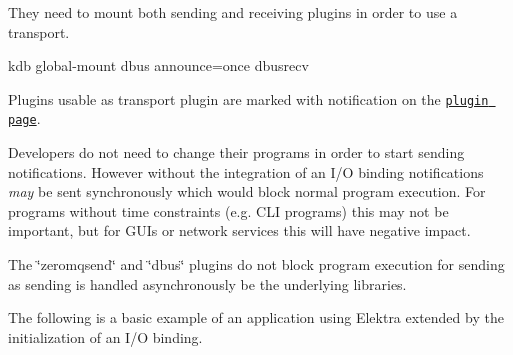 They need to mount both sending and receiving plugins in order to use a transport.


\begin{DoxyCode}
kdb global-mount dbus announce=once dbusrecv
\end{DoxyCode}


Plugins usable as transport plugin are marked with {\ttfamily notification} on the \href{https://www.libelektra.org/plugins/readme#notification-and-logging}{\tt plugin page}.

Developers do not need to change their programs in order to start sending notifications. However without the integration of an I/O binding notifications {\itshape may} be sent synchronously which would block normal program execution. For programs without time constraints (e.\+g. C\+LI programs) this may not be important, but for G\+U\+Is or network services this will have negative impact.

The \char`\"{}zeromqsend\char`\"{} and \char`\"{}dbus\char`\"{} plugins do not block program execution for sending as sending is handled asynchronously be the underlying libraries.

The following is a basic example of an application using Elektra extended by the initialization of an I/O binding.


